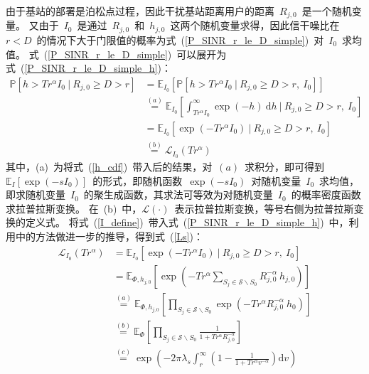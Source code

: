由于基站的部署是泊松点过程，因此干扰基站距离用户的距离~$R_{j,0}$~是一个随机变量。
又由于~$I_0$~是通过~$R_{j,0}$~和~$h_{j,0}$~这两个随机变量求得，因此信干噪比在~$r<D$~的情况下大于门限值的概率为式~(\ref{P_SINR_r_le_D_simple})~对~$I_0$~求均值。
式~(\ref{P_SINR_r_le_D_simple})~可以展开为式~(\ref{P_SINR_r_le_D_simple_h})：
\begin{equation}\label{P_SINR_r_le_D_simple_h}
  \begin{aligned}
    \mathbb{P}\left[h > T r ^ \alpha I_0 ~\bigg|~ R_{j,0} \geq D > r \right] & = \mathbb{E}_{I_0}\left[\mathbb{P}\left[h > T r ^ \alpha I_0 ~\big|~ R_{j,0} \geq D > r,~ I_0 \right]\right] \\
                                                                           & \overset{(a)}{=} \mathbb{E}_{I_0}\left[\int_{T r ^{\alpha} I_0}^{\infty} \exp(-h)~\mathrm{d} h~\bigg|~ R_{j,0} \geq D > r,~ I_0\right] \\
                                                                           & = \mathbb{E}_{I_0}\left[ \exp(-Tr^\alpha I_0)~\big|~ R_{j,0} \geq D > r,~ I_0\right] \\
                                                                           & \overset{(b)}{=} \mathcal{L}_{I_0}(Tr^\alpha)
  \end{aligned}
\end{equation}
其中，(a)~为将式~(\ref{h_cdf})~带入后的结果，对~$(a)$~求积分，即可得到~$\mathbb{E}_{I}[\exp(-sI_0)]$~的形式，即随机函数~$\exp(-sI_0)$~对随机变量~$I_0$~求均值，即求随机变量~$I_0$~的聚生成函数，其求法可等效为对随机变量~$I_0$~的概率密度函数求拉普拉斯变换。
在~(b)~中，$\mathcal{L}(\cdot)$~表示拉普拉斯变换，等号右侧为拉普拉斯变换的定义式。
将式~(\ref{I_define})~带入式~(\ref{P_SINR_r_le_D_simple_h})~中，利用\cite{ATractable}中的方法做进一步的推导，得到式~(\ref{Ls})：
\begin{equation}\label{Ls}
  \begin{aligned}
    \mathcal{L}_{I_0}(Tr^\alpha) &= \mathbb{E}_{I_0}\left[ \exp(-Tr^\alpha I_0)~\big|~ R_{j,0} \geq D > r,~ I_0\right] \\
                               &= \mathbb{E}_{\Phi, h_{j,0}}\left[\exp(-Tr^{\alpha}\sum\limits_{S_j\in \mathcal{S}\backslash S_0} {R_{j,0}^{-\alpha} ~ h_{j,0}})\right] \\
                               &\overset{(a)}{=} \mathbb{E}_{\Phi, h_{j,0}}\left[\prod\limits_{S_j\in \mathcal{S}\backslash S_0}\exp(-Tr^{\alpha} {R_{j,0}^{-\alpha} ~ h_0})\right] \\
                               &\overset{(b)}{=} \mathbb{E}_{\Phi} \left[\prod\limits_{S_j\in \mathcal{S}\backslash S_0}\frac{1}{1+ T r ^\alpha R_{j,0}^{-\alpha}}\right] \\
                               &\overset{(c)}{=} \exp\left(-2\pi\lambda_s\int_{r}^{\infty} \left(1 - \frac{1}{1+ T r ^\alpha v^{-\alpha}}\right)\mathrm{d}v\right)
  \end{aligned}
\end{equation}
